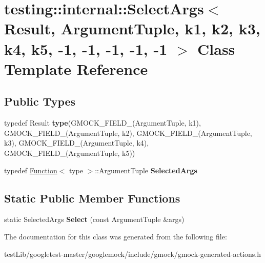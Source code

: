 \hypertarget{classtesting_1_1internal_1_1SelectArgs_3_01Result_00_01ArgumentTuple_00_01k1_00_01k2_00_01k3_00_dabb861d0dfd59e876e4adc8d7e61c25}{}\section{testing\+:\+:internal\+:\+:Select\+Args$<$ Result, Argument\+Tuple, k1, k2, k3, k4, k5, -\/1, -\/1, -\/1, -\/1, -\/1 $>$ Class Template Reference}
\label{classtesting_1_1internal_1_1SelectArgs_3_01Result_00_01ArgumentTuple_00_01k1_00_01k2_00_01k3_00_dabb861d0dfd59e876e4adc8d7e61c25}
\subsection*{Public Types}
\begin{DoxyCompactItemize}
\item 
\mbox{\label{classtesting_1_1internal_1_1SelectArgs_3_01Result_00_01ArgumentTuple_00_01k1_00_01k2_00_01k3_00_dabb861d0dfd59e876e4adc8d7e61c25_a64b825d66ab0457b44e260b2fd7e1946}} 
typedef Result {\bfseries type}(G\+M\+O\+C\+K\+\_\+\+F\+I\+E\+L\+D\+\_\+(Argument\+Tuple, k1), G\+M\+O\+C\+K\+\_\+\+F\+I\+E\+L\+D\+\_\+(Argument\+Tuple, k2), G\+M\+O\+C\+K\+\_\+\+F\+I\+E\+L\+D\+\_\+(Argument\+Tuple, k3), G\+M\+O\+C\+K\+\_\+\+F\+I\+E\+L\+D\+\_\+(Argument\+Tuple, k4), G\+M\+O\+C\+K\+\_\+\+F\+I\+E\+L\+D\+\_\+(Argument\+Tuple, k5))
\item 
\mbox{\label{classtesting_1_1internal_1_1SelectArgs_3_01Result_00_01ArgumentTuple_00_01k1_00_01k2_00_01k3_00_dabb861d0dfd59e876e4adc8d7e61c25_adc02f2ce0bec0329a74a88e01a586ca1}} 
typedef \hyperlink{structtesting_1_1internal_1_1Function}{Function}$<$ type $>$\+::Argument\+Tuple {\bfseries Selected\+Args}
\end{DoxyCompactItemize}
\subsection*{Static Public Member Functions}
\begin{DoxyCompactItemize}
\item 
\mbox{\label{classtesting_1_1internal_1_1SelectArgs_3_01Result_00_01ArgumentTuple_00_01k1_00_01k2_00_01k3_00_dabb861d0dfd59e876e4adc8d7e61c25_a08f454a7721b19e327042fd2bb6bf36f}} 
static Selected\+Args {\bfseries Select} (const Argument\+Tuple \&args)
\end{DoxyCompactItemize}


The documentation for this class was generated from the following file\+:\begin{DoxyCompactItemize}
\item 
test\+Lib/googletest-\/master/googlemock/include/gmock/gmock-\/generated-\/actions.\+h\end{DoxyCompactItemize}
